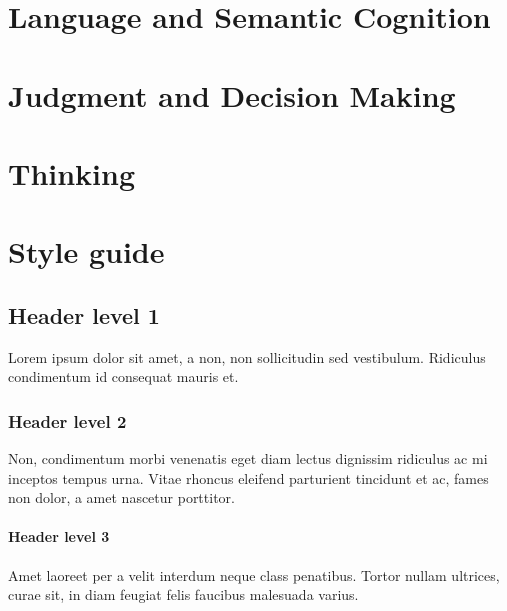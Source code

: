 \documentclass[
  oneside,
  12pt]{crumpbook}
\begin{document}
\hypertarget{language-and-semantic-cognition}{%
\chapter{Language and Semantic Cognition}\label{language-and-semantic-cognition}}

\hypertarget{judgment-and-decision-making}{%
\chapter{Judgment and Decision Making}\label{judgment-and-decision-making}}

\hypertarget{thinking}{%
\chapter{Thinking}\label{thinking}}

\hypertarget{style-guide}{%
\chapter*{Style guide}\label{style-guide}}

\hypertarget{header-level-1}{%
\section{Header level 1}\label{header-level-1}}

Lorem ipsum dolor sit amet, a non, non sollicitudin sed vestibulum. Ridiculus condimentum id consequat mauris et.

\hypertarget{header-level-2}{%
\subsection{Header level 2}\label{header-level-2}}

Non, condimentum morbi venenatis eget diam lectus dignissim ridiculus ac mi inceptos tempus urna. Vitae rhoncus eleifend parturient tincidunt et ac, fames non dolor, a amet nascetur porttitor.

\hypertarget{header-level-3}{%
\subsubsection{Header level 3}\label{header-level-3}}

Amet laoreet per a velit interdum neque class penatibus. Tortor nullam ultrices, curae sit, in diam feugiat felis faucibus malesuada varius.
\end{document}
